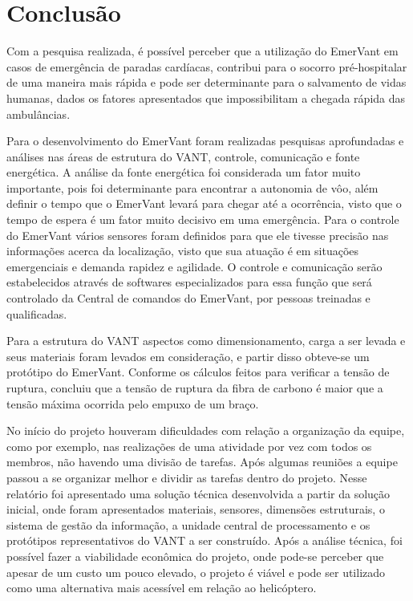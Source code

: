 \chapter{Conclusão}

Com a pesquisa realizada, é possível perceber  que a utilização do EmerVant em casos de emergência de paradas cardíacas, contribui para o socorro pré-hospitalar de uma maneira mais rápida e pode ser determinante para o salvamento de vidas humanas, dados os fatores apresentados que impossibilitam a chegada rápida  das ambulâncias.

Para o desenvolvimento do EmerVant foram realizadas  pesquisas aprofundadas e análises nas áreas de estrutura do VANT, controle, comunicação e fonte energética. A análise da fonte energética foi considerada  um fator muito importante, pois foi determinante para encontrar a autonomia de vôo, além definir o tempo que o EmerVant levará para chegar até a ocorrência, visto que o tempo de espera é um fator muito decisivo em uma emergência. 
Para  o controle do EmerVant vários sensores foram definidos para que ele tivesse precisão  nas  informações  acerca  da  localização,  visto que  sua  atuação é em situações emergenciais e demanda  rapidez e agilidade. O controle e comunicação serão estabelecidos através de softwares especializados para essa função que será controlado da Central de comandos do EmerVant, por pessoas treinadas e qualificadas.

Para  a estrutura do VANT aspectos como dimensionamento, carga a ser levada e seus materiais foram levados em consideração, e partir disso obteve-se um protótipo do EmerVant. Conforme os cálculos feitos para verificar a tensão de ruptura, concluiu que a tensão de ruptura da fibra de carbono é maior que a tensão máxima ocorrida pelo empuxo de um braço.

No início do projeto houveram  dificuldades com relação a organização da equipe, como por exemplo, nas realizações de uma atividade por vez com todos os membros, não havendo  uma divisão de tarefas. Após algumas reuniões a equipe passou a se organizar melhor e dividir as tarefas dentro do projeto. 
Nesse relatório foi apresentado uma solução técnica desenvolvida a partir da solução inicial, onde foram  apresentados materiais, sensores, dimensões estruturais, o sistema de gestão da informação, a unidade central de processamento e os protótipos representativos do VANT a ser construído. Após a análise técnica, foi possível fazer a viabilidade econômica do projeto, onde pode-se perceber que apesar de um custo um pouco elevado, o projeto é viável e pode ser utilizado como uma alternativa mais acessível em relação ao helicóptero.